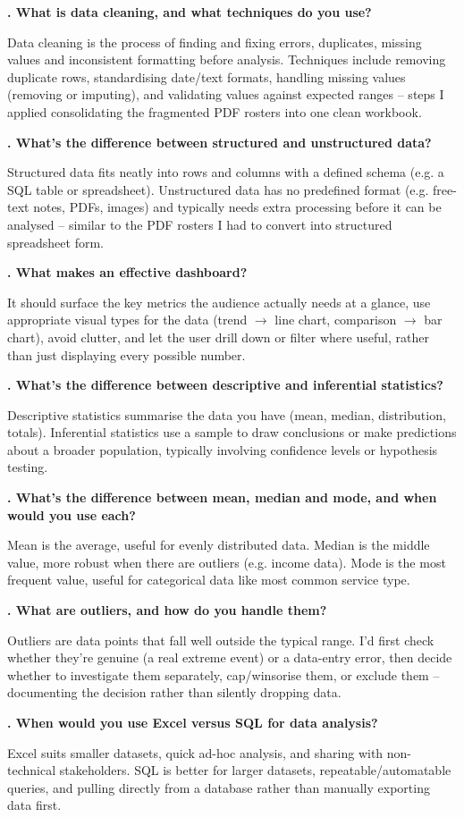 \documentclass[10.5pt]{article}
\newcounter{qnum}
\newcommand{\qa}[2]{%
  \stepcounter{qnum}%
  \textbf{\theqnum. #1}\par
  #2\par
  \vspace{6pt}
}
\begin{document}
\qa{What is data cleaning, and what techniques do you use?}{Data cleaning is the process of finding and fixing errors, duplicates, missing values and inconsistent formatting before analysis. Techniques include removing duplicate rows, standardising date/text formats, handling missing values (removing or imputing), and validating values against expected ranges -- steps I applied consolidating the fragmented PDF rosters into one clean workbook.}

\qa{What's the difference between structured and unstructured data?}{Structured data fits neatly into rows and columns with a defined schema (e.g. a SQL table or spreadsheet). Unstructured data has no predefined format (e.g. free-text notes, PDFs, images) and typically needs extra processing before it can be analysed -- similar to the PDF rosters I had to convert into structured spreadsheet form.}

\qa{What makes an effective dashboard?}{It should surface the key metrics the audience actually needs at a glance, use appropriate visual types for the data (trend $\rightarrow$ line chart, comparison $\rightarrow$ bar chart), avoid clutter, and let the user drill down or filter where useful, rather than just displaying every possible number.}

\qa{What's the difference between descriptive and inferential statistics?}{Descriptive statistics summarise the data you have (mean, median, distribution, totals). Inferential statistics use a sample to draw conclusions or make predictions about a broader population, typically involving confidence levels or hypothesis testing.}

\qa{What's the difference between mean, median and mode, and when would you use each?}{Mean is the average, useful for evenly distributed data. Median is the middle value, more robust when there are outliers (e.g. income data). Mode is the most frequent value, useful for categorical data like most common service type.}

\qa{What are outliers, and how do you handle them?}{Outliers are data points that fall well outside the typical range. I'd first check whether they're genuine (a real extreme event) or a data-entry error, then decide whether to investigate them separately, cap/winsorise them, or exclude them -- documenting the decision rather than silently dropping data.}

\qa{When would you use Excel versus SQL for data analysis?}{Excel suits smaller datasets, quick ad-hoc analysis, and sharing with non-technical stakeholders. SQL is better for larger datasets, repeatable/automatable queries, and pulling directly from a database rather than manually exporting data first.}
\end{document}
